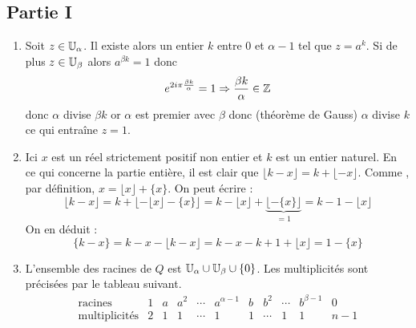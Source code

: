 \subsection*{Partie I}
\begin{enumerate}
\item Soit $z\in \mathbb{U}_\alpha$. Il existe alors un entier $k$ entre $0$ et $\alpha -1$ tel que $z=a^k$. Si de plus $z\in \mathbb{U}_\beta$ alors $a^{\beta k}=1$ donc 
\begin{displaymath}
 e^{2i\pi\frac{\beta k}{\alpha}}=1 \Rightarrow \frac{\beta k}{\alpha} \in \mathbb{Z}
\end{displaymath}
donc $\alpha$ divise $\beta k$ or $\alpha$ est premier avec $\beta$ donc (théorème de Gauss) $\alpha$ divise $k$ ce qui entraîne $z=1$.
\item Ici $x$ est un réel strictement positif non entier et $k$ est un entier naturel. En ce qui concerne la partie entière, il est clair que $\lfloor k-x\rfloor = k + \lfloor -x \rfloor$. Comme , par définition, $x = \lfloor x \rfloor +\{x\}$. On peut écrire :
\begin{displaymath}
 \lfloor k-x\rfloor = k + \lfloor -\lfloor x \rfloor -\{x\} \rfloor
= k -\lfloor x \rfloor +  \underset{=1}{\underbrace{\lfloor -\{x\} \rfloor}} 
=k -1 -\lfloor x \rfloor
\end{displaymath}
On en déduit :
\begin{displaymath}
 \{k-x\}=k-x - \lfloor  k-x \rfloor = k -x -k + 1 + \lfloor x \rfloor = 1 -\{ x \}
\end{displaymath} 
\item L'ensemble des racines de $Q$ est $\mathbb{U}_\alpha \cup \mathbb{U}_\beta \cup \{0\}$. Les multiplicités sont précisées par le tableau suivant.\begin{displaymath}
\begin{array}{c|c|c|c|c|c|c|c|c|c|c}
\text{racines} & 1 & a & a^2 & \cdots & a^{\alpha -1}& b & b^2 & \cdots & b^{\beta-1} & 0 \\ 
\hline
\text{multiplicités} & 2 & 1 & 1 & \cdots & 1 & 1 & \cdots & 1 & 1 & n-1 
\end{array}
\end{displaymath}


\end{enumerate}
